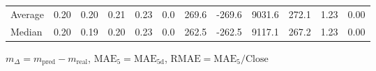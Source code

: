\begin{threeparttable}
{\begin{tabular}{lrrrrrrrrrrr}
Average &          0.20 &          0.20 &          0.21 &        0.23 &                 0.0 &               269.6 &     -269.6 &              9031.6 &            272.1 &            1.23 &                   0.00 \\
 Median &          0.20 &          0.19 &          0.20 &        0.23 &                 0.0 &               262.5 &     -262.5 &              9117.1 &            267.2 &            1.23 &                   0.00 \\
\bottomrule
\end{tabular}
}
\begin{tablenotes}\footnotesize
\item $m_\Delta=m_{\text{pred}}-m_{\text{real}}$,
$\mathrm{MAE}_5=\mathrm{MAE}_{5\text{d}}$,
$\mathrm{RMAE}=\mathrm{MAE}_5/\text{Close}$
\end{tablenotes}
\end{threeparttable}
\endgroup

